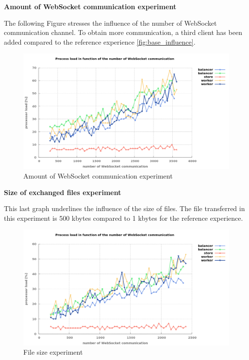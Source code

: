 \textbf{Amount of WebSocket communication experiment}

The following Figure stresses the influence of the number of WebSocket communication
channel. To obtain more communication, a third client has been added compared to 
the reference experience \ref{fig:base_influence}.

\begin{figure}[H]
	\centering
		\includegraphics[width=.9\textwidth]{./Figures/communication_server_influence.png}
	\caption[Amount of WebSocket communication experiment]{Amount of WebSocket communication experiment}
	\label{fig:communication_server_influence}
\end{figure}

\textbf{Size of exchanged files experiment}

This last graph underlines the influence of the size of files. The file transferred in this experiment is
500 kbytes compared to 1 kbytes for the reference experience.

\begin{figure}[H]
	\centering
		\includegraphics[width=\textwidth]{./Figures/file_server_influence.png}
	\caption[File size experiment]{File size experiment}
	\label{fig:file_server_influence}
\end{figure}



